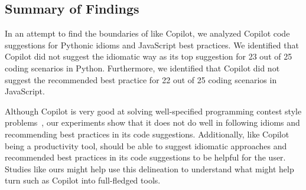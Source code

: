 \subsection{Summary of Findings}
In an attempt to find the boundaries of \cct{} like Copilot, we analyzed Copilot code suggestions for Pythonic idioms and JavaScript best practices. 
We identified that Copilot did not suggest the idiomatic way as its top suggestion for 23 out of 25 coding scenarios in Python. 
Furthermore, we identified that Copilot did not suggest the recommended best practice for 22 out of 25 coding scenarios in JavaScript.

Although Copilot is very good at solving well-specified programming contest style problems~\cite{empirical_eval}, our experiments show that it does not do well in following idioms and recommending best practices in its code suggestions.
Additionally, \cct{} like Copilot being a productivity tool, should be able to suggest idiomatic approaches and recommended best practices in its code suggestions to be helpful for the user.
Studies like ours might help use this delineation to understand what might help turn \cct{} such as Copilot into full-fledged \AISE{} tools.
